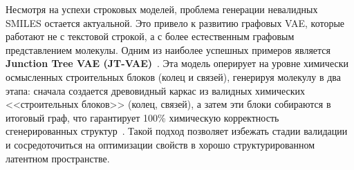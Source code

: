 Несмотря на успехи строковых моделей, проблема генерации невалидных SMILES остается актуальной. Это привело к развитию графовых VAE, которые работают не с текстовой строкой, а с более естественным графовым представлением молекулы. Одним из наиболее успешных примеров является \textbf{Junction Tree VAE (JT-VAE)}~\cite{kondratyev2023generative}. Эта модель оперирует на уровне химически осмысленных строительных блоков (колец и связей), генерируя молекулу в два этапа: сначала создается древовидный каркас из валидных химических <<строительных блоков>> (колец, связей), а затем эти блоки собираются в итоговый граф, что гарантирует 100\% химическую корректность сгенерированных структур~\cite{kondratyev2023generative}. Такой подход позволяет избежать стадии валидации и сосредоточиться на оптимизации свойств в хорошо структурированном латентном пространстве.
